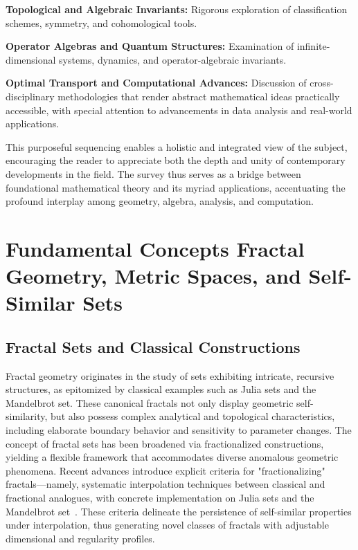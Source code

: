 \documentclass[sigconf]{acmart}
\begin{document}
\textbf{Topological and Algebraic Invariants:} Rigorous exploration of classification schemes, symmetry, and cohomological tools.

\textbf{Operator Algebras and Quantum Structures:} Examination of infinite-dimensional systems, dynamics, and operator-algebraic invariants.

\textbf{Optimal Transport and Computational Advances:} Discussion of cross-disciplinary methodologies that render abstract mathematical ideas practically accessible, with special attention to advancements in data analysis and real-world applications.

This purposeful sequencing enables a holistic and integrated view of the subject, encouraging the reader to appreciate both the depth and unity of contemporary developments in the field. The survey thus serves as a bridge between foundational mathematical theory and its myriad applications, accentuating the profound interplay among geometry, algebra, analysis, and computation.

\section{Fundamental Concepts Fractal Geometry, Metric Spaces, and Self-Similar Sets}

\subsection{Fractal Sets and Classical Constructions}

Fractal geometry originates in the study of sets exhibiting intricate, recursive structures, as epitomized by classical examples such as Julia sets and the Mandelbrot set. These canonical fractals not only display geometric self-similarity, but also possess complex analytical and topological characteristics, including elaborate boundary behavior and sensitivity to parameter changes. The concept of fractal sets has been broadened via fractionalized constructions, yielding a flexible framework that accommodates diverse anomalous geometric phenomena. Recent advances introduce explicit criteria for "fractionalizing" fractals—namely, systematic interpolation techniques between classical and fractional analogues, with concrete implementation on Julia sets and the Mandelbrot set~\cite{ref106}. These criteria delineate the persistence of self-similar properties under interpolation, thus generating novel classes of fractals with adjustable dimensional and regularity profiles.
\end{document}
